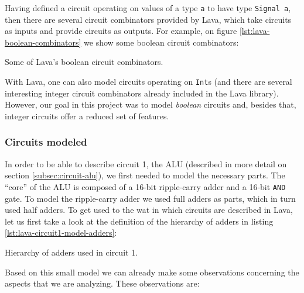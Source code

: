 \documentclass[a4paper]{article}
\begin{document}
            Having defined a circuit operating on values of a type \texttt{a} to have type
            \texttt{Signal a}, then there are several circuit combinators provided by Lava, which
            take circuits as inputs and provide circuits as outputs. For example, on figure
            \ref{lst:lava-boolean-combinators} we show some boolean circuit combinators:

            \begin{listing}[h!]
                \caption{Some of Lava's boolean circuit combinators.
                    \label{lst:lava-boolean-combinators}}
            \end{listing}

            With Lava, one can also model circuits operating on \texttt{Int}s (and there are several
            interesting integer circuit combinators already included in the Lava library). However,
            our goal in this project was to model \emph{boolean} circuits and, besides that, integer
            circuits offer a reduced set of features.


            \subsubsection{Circuits modeled}
            \label{subsubsec:lava-circuits}
                In order to be able to describe circuit 1, the ALU (described in more detail on
                section \ref{subsec:circuit-alu}), we first needed to model the necessary
                parts. The ``core'' of the ALU is composed of a 16-bit ripple-carry adder and
                a 16-bit \texttt{AND} gate. To model the ripple-carry adder we used full adders as
                parts, which in turn used half adders. To get used to the wat in which
                circuits are described in Lava, let us first take a look at the definition of the
                hierarchy of adders in listing \ref{lst:lava-circuit1-model-adders}:

                \begin{listing}[h!]
                    \caption{Hierarchy of adders used in circuit 1.
                        \label{lst:lava-circuit1-model-adders}}
                \end{listing}

                Based on this small model we can already make some observations concerning the
                aspects that we are analyzing. These observations are:
\end{document}
